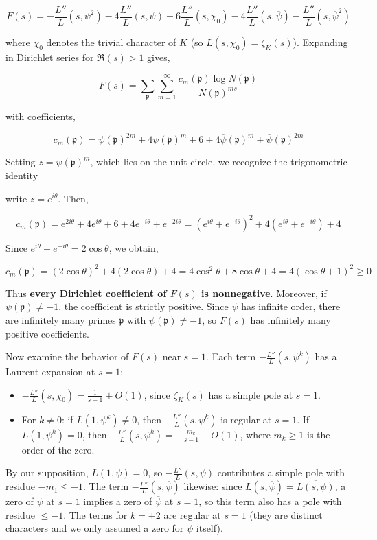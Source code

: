\documentclass[12pt,a4paper]{article}
\begin{document}
\[
F(s) = -\frac{L''}{L}(s, \psi^2) - 4\frac{L''}{L}(s, \psi) - 6\frac{L''}{L}(s, \chi_0) - 4\frac{L''}{L}(s, \overline{\psi}) - \frac{L''}{L}(s, \overline{\psi}^2)
\]

where $\chi_0$ denotes the trivial character of $K$ (so $L(s, \chi_0) = \zeta_K(s)$). Expanding in Dirichlet series for $\Re(s) > 1$ gives,

\[
F(s) = \sum_{\mathfrak{p}} \sum_{m=1}^{\infty} \frac{c_m(\mathfrak{p}) \log N(\mathfrak{p})}{N(\mathfrak{p})^{ms}}
\]

with coefficients,

\[
c_m(\mathfrak{p}) = \psi(\mathfrak{p})^{2m} + 4\psi(\mathfrak{p})^m + 6 + 4\overline{\psi}(\mathfrak{p})^m + \overline{\psi}(\mathfrak{p})^{2m}
\]

Setting $z = \psi(\mathfrak{p})^m$, which lies on the unit circle, we recognize the trigonometric identity

write $z = e^{i\theta}$. Then,

\[
c_m(\mathfrak{p}) = e^{2i\theta} + 4e^{i\theta} + 6 + 4e^{-i\theta} + e^{-2i\theta} = (e^{i\theta} + e^{-i\theta})^2 + 4(e^{i\theta} + e^{-i\theta}) + 4
\]

Since $e^{i\theta} + e^{-i\theta} = 2\cos\theta$, we obtain,

\[
c_m(\mathfrak{p}) = (2\cos\theta)^2 + 4(2\cos\theta) + 4 = 4\cos^2\theta + 8\cos\theta + 4 = 4(\cos\theta + 1)^2 \geq 0
\]

Thus \textbf{every Dirichlet coefficient of $F(s)$ is nonnegative}. Moreover, if $\psi(\mathfrak{p}) \neq -1$, the coefficient is strictly positive. Since $\psi$ has infinite order, there are infinitely many primes $\mathfrak{p}$ with $\psi(\mathfrak{p}) \neq -1$, so $F(s)$ has infinitely many positive coefficients.

Now examine the behavior of $F(s)$ near $s=1$. Each term $-\frac{L''}{L}(s, \psi^k)$ has a Laurent expansion at $s=1$:

\begin{itemize}
    \item $-\frac{L''}{L}(s, \chi_0) = \frac{1}{s-1} + O(1)$, since $\zeta_K(s)$ has a simple pole at $s=1$.
    \item For $k \neq 0$: if $L(1, \psi^k) \neq 0$, then $-\frac{L''}{L}(s, \psi^k)$ is regular at $s=1$. If $L(1, \psi^k) = 0$, then $-\frac{L''}{L}(s, \psi^k) = -\frac{m_k}{s-1} + O(1)$, where $m_k \geq 1$ is the order of the zero.
\end{itemize}

By our supposition, $L(1, \psi) = 0$, so $-\frac{L''}{L}(s, \psi)$ contributes a simple pole with residue $-m_1 \leq -1$. The term $-\frac{L''}{L}(s, \overline{\psi})$ likewise: since $L(s, \overline{\psi}) = \overline{L(\overline{s}, \psi)}$, a zero of $\psi$ at $s=1$ implies a zero of $\overline{\psi}$ at $s=1$, so this term also has a pole with residue $\leq -1$. The terms for $k = \pm 2$ are regular at $s=1$ (they are distinct characters and we only assumed a zero for $\psi$ itself).
\end{document}
